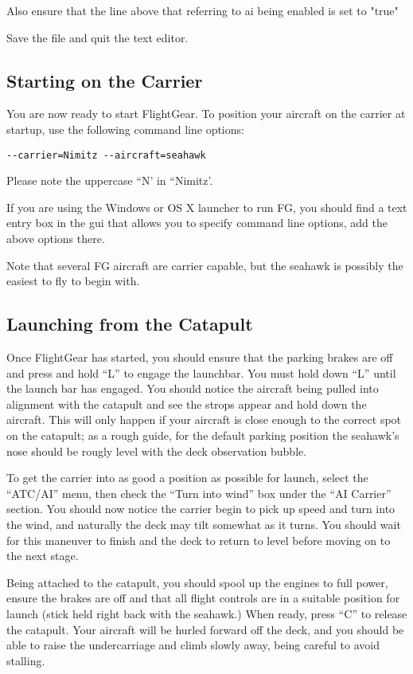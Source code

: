 Also ensure that the line above that referring to ai being enabled is set to "true"

Save the file and quit the text editor.

\subsection{Starting on the Carrier}

You are now ready to start FlightGear. To position your aircraft on the carrier at startup,
use the following command line options:

\begin{verbatim}
--carrier=Nimitz --aircraft=seahawk
\end{verbatim}

Please note the uppercase ``N' in ``Nimitz'.

If you are using the Windows or OS X launcher to run FG, you should find a text entry box in the gui that
allows you to specify command line options, add the above options there.

Note that several FG aircraft are carrier capable, but the seahawk is possibly the easiest to fly to begin with.

\subsection{Launching from the Catapult}

Once FlightGear has started, you should ensure that the parking brakes are off and press and hold ``L'' to
engage the launchbar. You must hold down ``L'' until the launch bar has engaged.
You should notice the aircraft being pulled into alignment with the catapult and see
the strops appear and hold down the aircraft.  This will only happen if your aircraft is
close enough to the correct spot on the catapult; as a rough guide, for the default
parking position the seahawk's nose should be rougly level with the deck observation bubble.

To get the carrier into as good a position as possible for launch, select the ``ATC/AI'' menu, then
check the ``Turn into wind'' box under the ``AI Carrier'' section. You should now notice the carrier
begin to pick up speed and turn into the wind, and naturally the deck may tilt somewhat as it turns.
You should wait for this maneuver to finish and the deck to return to level before moving on to the next stage.

Being attached to the catapult, you should spool up the engines to full power, ensure the brakes are off
and that all flight controls are in a suitable position for launch (stick held right back with the seahawk.)
When ready, press ``C'' to release the catapult. Your aircraft will be hurled forward off the deck, and
you should be able to raise the undercarriage and climb slowly away, being careful to avoid stalling.

